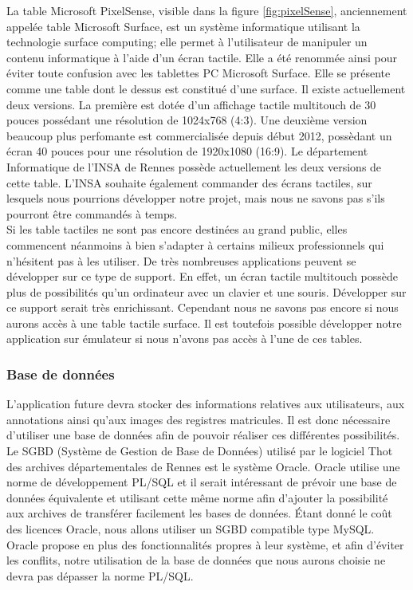 \documentclass[a4paper]{article}
\begin{document}
La table Microsoft PixelSense, visible dans la figure \ref{fig:pixelSense},  anciennement appel\'ee table Microsoft Surface, est un syst\`eme informatique utilisant la technologie surface computing; elle permet \`a l'utilisateur de manipuler un contenu informatique \`a l'aide d'un \'ecran tactile. Elle a \'et\'e renomm\'ee ainsi pour \'eviter toute confusion avec les tablettes PC Microsoft Surface. Elle se pr\'esente comme une table dont le dessus est constitu\'e d'une surface. Il existe actuellement deux versions. La premi\`ere est dot\'ee d'un affichage tactile multitouch de 30 pouces poss\'edant une r\'esolution de 1024x768 (4:3). Une deuxi\`eme version beaucoup plus perfomante est commercialis\'ee depuis d\'ebut 2012, poss\`edant un \'ecran 40 pouces pour une r\'esolution de 1920x1080 (16:9). Le d\'epartement Informatique de l'INSA de Rennes poss\`ede actuellement les deux versions de cette table. L'INSA souhaite \'egalement commander des \'ecrans tactiles, sur lesquels nous pourrions d\'evelopper notre projet, mais nous ne savons pas s'ils pourront \^etre command\'es \`a temps.\\
    
Si les table tactiles ne sont pas encore destin\'ees au grand public, elles commencent n\'eanmoins \`a bien s'adapter \`a certains milieux professionnels qui n'h\'esitent pas \`a les utiliser. De tr\`es nombreuses applications peuvent se d\'evelopper sur ce type de support. En effet, un \'ecran tactile multitouch poss\`ede plus de possibilit\'es qu'un ordinateur avec un clavier et une souris. D\'evelopper sur ce support serait tr\`es enrichissant. Cependant nous ne savons pas encore si nous aurons acc\`es \`a une table tactile surface. Il est toutefois possible d\'evelopper notre application sur \'emulateur si nous n'avons pas acc\`es \`a l'une de ces tables.

\subsubsection{Base de donn\'ees}
\label{subsubsec:database}

L'application future devra stocker des informations relatives aux utilisateurs, aux annotations ainsi qu'aux images des registres matricules. Il est donc n\'ecessaire d'utiliser une base de donn\'ees afin de pouvoir r\'ealiser ces diff\'erentes possibilit\'es.
\\

Le SGBD (Syst\`eme de Gestion de Base de Donn\'ees) utilis\'e par le logiciel Thot des archives d\'epartementales de Rennes est le syst\`eme Oracle. Oracle utilise une norme de d\'eveloppement PL/SQL et il serait int\'eressant de pr\'evoir une base de donn\'ees \'equivalente et utilisant cette m\^eme norme afin d'ajouter la possibilit\'e aux archives de transf\'erer facilement les bases de donn\'ees. \'Etant donn\'e le co\^ut des licences Oracle, nous allons utiliser un SGBD compatible type MySQL. Oracle propose en plus des fonctionnalit\'es propres \`a leur syst\`eme, et afin d'\'eviter les conflits, notre utilisation de la base de donn\'ees que nous aurons choisie ne devra pas d\'epasser la norme PL/SQL.
\end{document}
